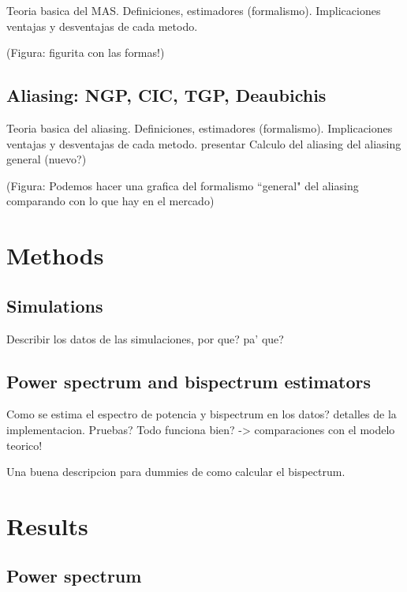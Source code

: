 \documentclass[useAMS,usenatbib]{mn2e}
\begin{document}
Teoria basica del MAS. Definiciones, estimadores
(formalismo). Implicaciones ventajas y desventajas de cada metodo.

(Figura: figurita con las formas!)

\subsection{Aliasing: NGP, CIC, TGP, Deaubichis}
\label{sec:theory:aliasing}

Teoria basica del aliasing. Definiciones, estimadores
(formalismo). Implicaciones ventajas y desventajas de cada metodo.
presentar Calculo del aliasing del aliasing general (nuevo?)

(Figura: Podemos hacer una grafica del formalismo ``general" del
aliasing comparando con lo que hay en el mercado)

\section{Methods}
\label{sec:methods}

\subsection{Simulations}
\label{sec:methods:simulations}

Describir los datos de las simulaciones, por que? pa' que?

\subsection{Power spectrum and bispectrum estimators}
\label{sec:methods:pkbk}

Como se estima el espectro de potencia y bispectrum en los datos?
detalles de la implementacion.
Pruebas? Todo funciona bien? -> comparaciones con el modelo teorico!

Una buena descripcion para dummies de como calcular el bispectrum.

\section{Results} 
\label{sec:results}

\subsection{Power spectrum}
\label{sec:results:pk}
\end{document}
